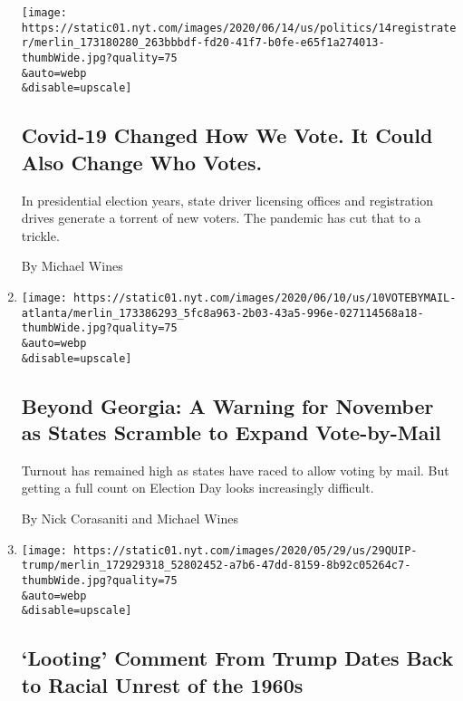 \begin{enumerate}
  \texttt{[image: https://static01.nyt.com/images/2020/06/14/us/politics/14registrater/merlin\_173180280\_263bbbdf-fd20-41f7-b0fe-e65f1a274013-thumbWide.jpg?quality=75\\\&auto=webp\\\&disable=upscale]}

  \hypertarget{covid-19-changed-how-we-vote-it-could-also-change-who-votes}{%
  \subsection{Covid-19 Changed How We Vote. It Could Also Change Who
  Votes.}\label{covid-19-changed-how-we-vote-it-could-also-change-who-votes}}

  In presidential election years, state driver licensing offices and
  registration drives generate a torrent of new voters. The pandemic has
  cut that to a trickle.

  By Michael Wines
\item
  \href{/2020/06/10/us/politics/voting-by-mail-georgia.html}{}

  \texttt{[image: https://static01.nyt.com/images/2020/06/10/us/10VOTEBYMAIL-atlanta/merlin\_173386293\_5fc8a963-2b03-43a5-996e-027114568a18-thumbWide.jpg?quality=75\\\&auto=webp\\\&disable=upscale]}

  \hypertarget{beyond-georgia-a-warning-for-november-as-states-scramble-to-expand-vote-by-mail}{%
  \subsection{Beyond Georgia: A Warning for November as States Scramble
  to Expand
  Vote-by-Mail}\label{beyond-georgia-a-warning-for-november-as-states-scramble-to-expand-vote-by-mail}}

  Turnout has remained high as states have raced to allow voting by
  mail. But getting a full count on Election Day looks increasingly
  difficult.

  By Nick Corasaniti and Michael Wines
\item
  \href{/2020/05/29/us/looting-starts-shooting-starts.html}{}

  \texttt{[image: https://static01.nyt.com/images/2020/05/29/us/29QUIP-trump/merlin\_172929318\_52802452-a7b6-47dd-8159-8b92c05264c7-thumbWide.jpg?quality=75\\\&auto=webp\\\&disable=upscale]}

  \hypertarget{looting-comment-from-trump-dates-back-to-racial-unrest-of-the-1960s}{%
  \subsection{`Looting' Comment From Trump Dates Back to Racial Unrest
  of the
  1960s}\label{looting-comment-from-trump-dates-back-to-racial-unrest-of-the-1960s}}


\end{enumerate}
